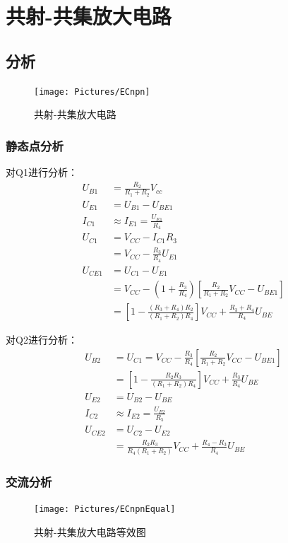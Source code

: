 \documentclass[11pt,a4paper,UTF8]{ctexart}
\begin{document}
	\section{共射-共集放大电路}
		\subsection{分析}
			\begin{figure}[H]
				\centering
				\texttt{[image: Pictures/ECnpn]}
				\caption{共射-共集放大电路}
				\label{fig:ecnpn}
			\end{figure}
			\subsubsection{静态点分析}
			对Q1进行分析：
			\begin{align}
				U_{B1} &= \frac{R_2}{R_1+R_2}V_{cc} \\	
				U_{E1} &= U_{B1} - U_{BE1} \\
				I_{C1} &\approx I_{E1} = \frac{U_{E1}}{R_4} \\
				U_{C1} &= V_{CC} - I_{C1}R_3 \nonumber\\ 
				&= V_{CC} - \frac{R_3}{R_4}U_{E1} \\
				U_{CE1} &= U_{C1} - U_{E1} \nonumber\\
				&= V_{CC} - (1+\frac{R_3}{R_4})[\frac{R_2}{R_1+R_2}V_{CC}-U_{BE1}] \nonumber\\
				&= [1-\frac{(R_3+R_4)R_2}{(R_1+R_2)R_4}]V_{CC} + \frac{R_3+R_4}{R_4}U_{BE}
			\end{align}
			
			对Q2进行分析：
			\begin{align}
				U_{B2} &= U_{C1} = V_{CC} - \frac{R_3}{R_4}[\frac{R_2}{R_1+R_2}V_{CC}-U_{BE1}] \nonumber\\
				&= [1-\frac{R_2R_3}{(R_1+R_2)R_4}]V_{CC} + \frac{R_3}{R_4}U_{BE} \\
				U_{E2} &= U_{B2} - U_{BE} \\
				I_{C2} &\approx I_{E2} = \frac{U_{E2}}{R_5} \\
				U_{CE2} &= U_{C2} - U_{E2} \nonumber\\
				&= \frac{R_2R_3}{R_4(R_1+R_2)}V_{CC} + \frac{R_4-R_3}{R_4}U_{BE}
			\end{align}
				
			\subsubsection{交流分析}
			\begin{figure}[H]
				\centering
				\texttt{[image: Pictures/ECnpnEqual]}
				\caption{共射-共集放大电路等效图}
				\label{fig:ecnpnequal}
			\end{figure}
			
\end{document}
